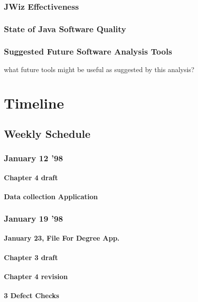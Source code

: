 \subsection{JWiz Effectiveness}
\subsection{State of Java Software Quality}
\subsection{Suggested Future Software Analysis Tools}
what future tools might be useful as suggested by this analysis?


\chapter{Timeline}
\section{Weekly Schedule}

\subsection{January 12 '98}
\subsubsection{Chapter 4 draft}
\subsubsection{Data collection Application}

\subsection{January 19 '98}
\subsubsection{January 23, File For Degree App.}
\subsubsection{Chapter 3 draft}
\subsubsection{Chapter 4 revision}
\subsubsection{3 Defect Checks}


